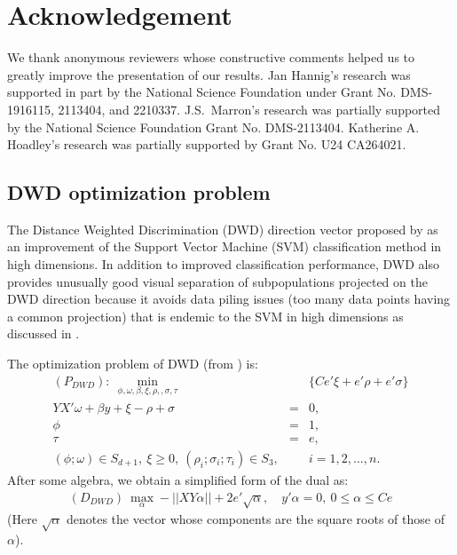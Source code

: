 \documentclass[12pt]{article}
\begin{document}
 \section{Acknowledgement}
 We thank anonymous reviewers whose constructive comments helped us to greatly improve the presentation of our results. 
 Jan Hannig's research was supported in part by the National Science Foundation under Grant No. DMS-1916115, 2113404, and  2210337. J.S.~Marron's research was partially supported by the National Science Foundation Grant No. DMS-2113404.
 Katherine A. Hoadley's research was partially supported by Grant No. U24 CA264021.



\newpage
\begin{appendices}
\section{DWD optimization problem}
\label{ap:DWD}
The Distance Weighted Discrimination (DWD)
direction vector proposed by \citet{marron2007distance} as an improvement of the Support
Vector Machine (SVM) \citep{cortes1995support} classification method in high dimensions. In addition to improved classification
performance, DWD also provides unusually good visual separation of
subpopulations projected on the DWD direction because it avoids data piling issues (too many data points having a common projection) that is endemic to the SVM in high dimensions as discussed in \citet{marron2007distance}. 

The optimization problem of DWD (from \citet{marron2007distance}) is:
\begin{eqnarray*}
(P_{DWD}): \ \min_{\phi, \omega, \beta, \xi, \rho, ,\sigma, \tau} &\ &\{ Ce'\xi+e'\rho+e'\sigma\}\\
YX'\omega+\beta y+\xi-\rho+\sigma&=&0,\\
\phi&=&1,\\
\tau &=&e,\\
(\phi;\omega)\in S_{d+1},\  \xi\ge 0,\  (\rho_{i};\sigma_{i};\tau_{i})\in S_3,& & i=1, 2, ..., n.
\end{eqnarray*}
After some algebra, we obtain a simplified form of the dual as:
\begin{eqnarray*}
(D_{DWD})\ \max_{\alpha} -||XY\alpha||+2e'\sqrt{\alpha}, \quad y'\alpha=0,\ 0\le \alpha \le Ce
\end{eqnarray*}
(Here $\sqrt{\alpha}$ denotes the vector whose components are the square roots of those of $\alpha$). 




\end{appendices}
\end{document}
